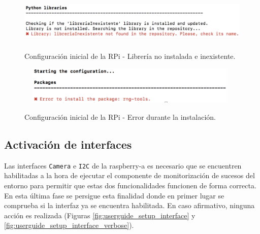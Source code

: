 \documentclass[12pt,a4paper, twoside]{report}
\begin{document}
\begin{itemize}
		\begin{figure}[!ht]   
			\caption{Configuración inicial de la RPi - Librería no instalada e inexistente.} 
			\begin{center} 
				\includegraphics[width=13cm,height=2.2cm]{Images/userGuide/setup/library_noexiste} \\
				\label{fig:userguide_setup_library_noexiste} 
			\end{center}  
		\end{figure}
		
		\begin{figure}[!ht]   
			\caption{Configuración inicial de la RPi - Error durante la instalación.} 
			\begin{center} 
				\includegraphics[width=11cm,height=1.8cm]{Images/userGuide/setup/error_install} \\
				\label{fig:userguide_setup_error_install} 
			\end{center}  
		\end{figure}
		
	\end{itemize}
 
	\newpage
	
	\subsection{Activación de interfaces}
	 	
	 Las interfaces \texttt{Camera} e \texttt{I2C} de la \gls{raspberry-a} es necesario que se encuentren habilitadas a la hora de ejecutar el componente de monitorización de sucesos del entorno para permitir que estas dos funcionalidades funcionen de forma correcta. En esta última fase se persigue esta finalidad donde en primer lugar se comprueba si la interfaz ya se encuentra habilitada. En caso afirmativo, ninguna acción es realizada (Figuras \ref{fig:userguide_setup_interface} y \ref{fig:userguide_setup_interface_verbose}). \\
	 	
\end{document}
